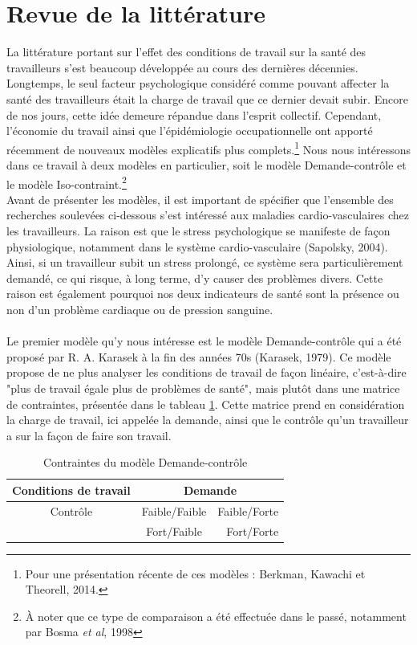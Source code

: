 \documentclass[a4paper, oneside, titlepage]{article}
\begin{document}
\section{Revue de la littérature}
La littérature portant sur l'effet des conditions de travail sur la santé des travailleurs s'est beaucoup développée au cours des dernières décennies. Longtemps, le seul facteur psychologique considéré comme pouvant affecter la santé des travailleurs était la charge de travail que ce dernier devait subir. Encore de nos jours, cette idée demeure répandue dans l'esprit collectif. Cependant, l'économie du travail ainsi que l'épidémiologie occupationnelle ont apporté récemment de nouveaux modèles explicatifs plus complets.\footnote{Pour une présentation récente de ces modèles : Berkman, Kawachi et Theorell, 2014.} Nous nous intéressons dans ce travail à deux modèles en particulier, soit le modèle Demande-contrôle et le modèle Iso-contraint.\footnote{À noter que ce type de comparaison a été effectuée dans le passé, notamment par Bosma \textit{et al}, 1998}
\\
Avant de présenter les modèles, il est important de spécifier que l'ensemble des recherches soulevées ci-dessous s'est intéressé aux maladies cardio-vasculaires chez les travailleurs. La raison est que le stress psychologique se manifeste de façon physiologique, notamment dans le système cardio-vasculaire (Sapolsky, 2004). Ainsi, si un travailleur subit un stress prolongé, ce système sera particulièrement demandé, ce qui risque, à long terme, d'y causer des problèmes divers. Cette raison est également pourquoi nos deux indicateurs de santé sont la présence ou non d'un problème cardiaque ou de pression sanguine.
\\
\\
Le premier modèle qu'y nous intéresse est le modèle Demande-contrôle qui a été proposé par R. A. Karasek à la fin des années 70s (Karasek, 1979). Ce modèle propose de ne plus analyser les conditions de travail de façon linéaire, c'est-à-dire "plus de travail égale plus de problèmes de santé", mais plutôt dans une matrice de contraintes, présentée dans le tableau \ref{DC}. Cette matrice prend en considération la charge de travail, ici appelée la demande, ainsi que le contrôle qu'un travailleur a sur la façon de faire son travail.
\begin{table}[H]
\centering
\caption{Contraintes du modèle Demande-contrôle}
\label{DC}
\begin{tabular}{|c|c|r|} 
   \hline
    Conditions de travail & \multicolumn{2}{c|}{Demande} \\
    \hline
    Contrôle & Faible/Faible & Faible/Forte \\
    \cline{2-3} 
        & Fort/Faible & Fort/Forte \\
    \hline
 \end{tabular}
\end{table}
\end{document}
